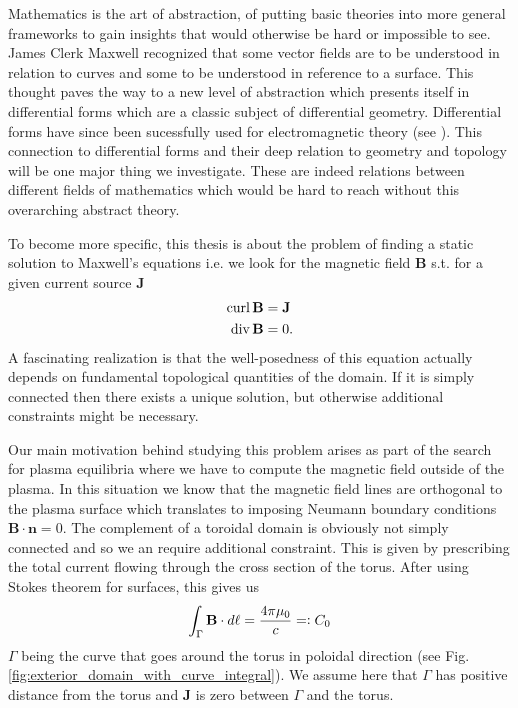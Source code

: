 \documentclass[../master_thesis.tex]{subfiles}
\begin{document}
Mathematics is the art of abstraction, of putting basic theories into more 
general frameworks to gain insights that would otherwise be hard or 
impossible to see. James Clerk Maxwell recognized that some
vector fields are to be understood in relation to curves 
and some to be understood in reference to a surface. 
This thought paves the way to a new level of abstraction
which presents itself in differential forms which are a classic 
subject of differential geometry. Differential forms have since been sucessfully
used for electromagnetic theory (see \cite{differential_forms_electromagnetism}).
This connection to differential forms and their deep relation to geometry and topology
will be one major thing we investigate. These are indeed relations between different 
fields of mathematics which would be hard to reach without this overarching abstract theory.

To become more specific, this thesis is about the problem of finding a static solution to Maxwell's equations
i.e. we look for the magnetic field $\mathbf{B}$ s.t. for a given current source 
$\mathbf{J}$ 
\begin{align*}
    \operatorname{curl} \mathbf{B} &= \mathbf{J} 
    \\ \operatorname{div} \mathbf{B} &= 0.
\end{align*}
A fascinating realization is that the well-posedness of this equation actually 
depends on fundamental topological quantities of the domain. If it is simply 
connected then there exists a unique solution, but otherwise additional constraints 
might be necessary.

Our main motivation behind studying this problem arises as part of the search for plasma equilibria where we have to 
compute the magnetic field outside of the plasma.
In this situation we know that the magnetic field lines are orthogonal to the plasma surface
which translates to imposing Neumann boundary conditions 
$\mathbf{B} \cdot \mathbf{n} = 0$. The complement of a toroidal domain is obviously not simply connected and so 
we an require additional constraint. This is given by prescribing the total 
current flowing through the cross section of the torus. After using Stokes theorem 
for surfaces, this gives us 
\begin{align*}
    \int_\Gamma \mathbf{B}\cdot d\ell = \frac{4 \pi \mu_0}{c} =\vcentcolon C_0
\end{align*}
$\Gamma$ being the curve that goes around the torus 
in poloidal direction (see Fig.\,\ref{fig:exterior_domain_with_curve_integral}). 
We assume here that $\Gamma$ has positive distance from the torus and 
$\mathbf{J}$ is zero between $\Gamma$ and the torus.
\end{document}
